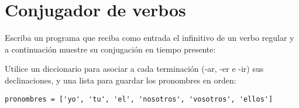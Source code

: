 \section{Conjugador de verbos}

Escriba un programa que reciba como entrada el infinitivo de un verbo
regular y a continuación muestre su conjugación en tiempo presente:

Utilice un diccionario para asociar a cada terminación (-ar, -er e -ir)
sus declinaciones, y una lista para guardar los pronombres en orden:

\begin{lstlisting}
pronombres = ['yo', 'tu', 'el', 'nosotros', 'vosotros', 'ellos']
\end{lstlisting}

